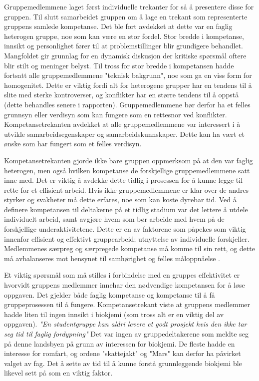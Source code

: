 Gruppemedlemmene laget først individuelle trekanter for så å presentere disse for gruppen.
Til slutt samarbeidet gruppen om å lage en trekant som representerte gruppens samlede kompetanse.
Det ble fort avdekket at dette var en faglig heterogen gruppe, noe som kan være en stor fordel.
Stor bredde i kompetanse, innsikt og personlighet fører til at problemstillinger blir grundigere behandlet.
Mangfoldet gir grunnlag for en dynamisk diskusjon der kritiske spørsmål oftere blir stilt og meninger belyst.
Til tross for stor bredde i kompetansen hadde fortsatt alle gruppemedlemmene "teknisk bakgrunn", noe som ga en viss form for homogenitet.
Dette er viktig fordi alt for heterogene grupper har en tendens til å slite med sterke kontroverser, og konflikter har en større tendens til å oppstå (dette behandles senere i rapporten).
Gruppemedlemmene bør derfor ha et felles grunnsyn eller verdisyn som kan fungere som en rettesnor ved konflikter.
Kompetansetrekanten avdekket at alle gruppemedlemmene var interessert i å utvikle samarbeidsegenskaper og samarbeidskunnskaper.
Dette kan ha vært et ønske som har fungert som et felles verdisyn. 

Kompetansetrekanten gjorde ikke bare gruppen oppmerksom på at den var faglig heterogen, men også hvilken kompetanse de forskjellige gruppemedlemmene satt inne med.
Det er viktig å avdekke dette tidlig i prosessen for å kunne legge til rette for et effisient arbeid.
Hvis ikke gruppemedlemmene er klar over de andres styrker og svakheter må dette erfares, noe som kan koste dyrebar tid.
Ved å definere kompetansen til deltakerne på et tidlig stadium var det lettere å utdele individuelt arbeid, samt avgjøre hvem som bør arbeide med hvem på de forskjellige underaktivitetene.
Dette er en av faktorene som påpekes som viktig innenfor effisient og effektivt gruppearbeid; utnyttelse av individuelle forskjeller.
Medlemmenes særpreg og særpregede kompetanse må komme til sin rett, og dette må avbalanseres mot hensynet til samhørighet og felles måloppnåelse \cite{orgorg}. 

Et viktig spørsmål som må stilles i forbindelse med en gruppes effektivitet er hvorvidt gruppens medlemmer innehar den nødvendige kompetansen for å løse oppgaven.
Det gjelder både faglig kompetanse og kompetanse til å få gruppeprosessen til å fungere.
Kompetansetrekant viste at gruppens medlemmer hadde liten til ingen innsikt i biokjemi (som tross alt er en viktig del av oppgaven).
\textit{"En studentgruppe kan aldri levere et godt prosjekt hvis den ikke tar seg tid til faglig fordypning"} \cite{orgorg}
Det var ingen av gruppedeltakerene som meldte seg på denne landsbyen på grunn av interessen for biokjemi.
De fleste hadde en interesse for romfart, og ordene "skattejakt" og "Mars" kan derfor ha påvirket valget av fag.
Det å sette av tid til å kunne forstå grunnleggende biokjemi ble likevel sett på som en viktig faktor.

